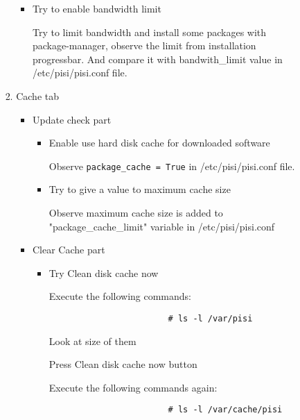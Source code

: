 \documentclass[a4paper,10pt]{article}
\begin{document}
\begin{enumerate}
\begin{enumerate}
\begin{enumerate}
\begin{enumerate}
\begin{itemize}
                    \item Try to enable bandwidth limit

                    Try to limit bandwidth and install some packages with package-manager, observe the limit from installation progressbar. And compare it with bandwith\_limit value in /etc/pisi/pisi.conf file.
                \end{itemize}
                \item Cache tab
                \begin{itemize}
                    \item Update check part
                    \begin{itemize}
                        \item Enable use hard disk cache for downloaded software

                        Observe \texttt{package\_cache = True} in /etc/pisi/pisi.conf file.

                        \item Try to give a value to maximum cache size

                        Observe maximum cache size is added to "package\_cache\_limit" variable in /etc/pisi/pisi.conf
                    \end{itemize}
                    \item Clear Cache part
                    \begin{itemize}
                        \item Try Clean disk cache now

                        Execute the following commands: 
                        \begin{verbatim}
                        # ls -l /var/pisi
                        \end{verbatim}

                        Look at size of them 

                        Press Clean disk cache now button

                        Execute the following commands again:

                        \begin{verbatim}
                        # ls -l /var/cache/pisi
                        \end{verbatim}


\end{itemize}
\end{itemize}
\end{enumerate}
\end{enumerate}
\end{enumerate}
\end{enumerate}
\end{document}
